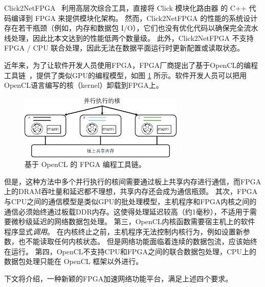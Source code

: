 Click2NetFPGA~\cite {Click2NetFPGA} 利用高层次综合工具，直接将 Click 模块化路由器 \cite {kohler2000click} 的 C++ 代码编译到 FPGA 来提供模块化架构。
然而，Click2NetFPGA 的性能的系统设计存在若干瓶颈（例如，内存和数据包 I/O），它们也没有优化代码以确保完全流水线处理，因此比本文达到的性能低两个数量级。
此外，Click2NetFPGA 不支持 FPGA / CPU 联合处理，因此无法在数据平面运行时更新配置或读取状态。

近年来，为了让软件开发人员使用FPGA，FPGA厂商提出了基于OpenCL的编程工具链~\cite{aoc,sdaccel}，提供了类似GPU的编程模型，如图 \ref{intro:fig:opencl} 所示。软件开发人员可以把用OpenCL语言编写的核（kernel）卸载到FPGA上。


\begin{figure}[htbp]
	\centering
	\includegraphics[width=0.7\textwidth]{figures/opencl.pdf}
	\caption{基于 OpenCL 的 FPGA 编程工具链。}
	\label{intro:fig:opencl}
\end{figure}


但是，这种方法中多个并行执行的核间需要通过板上共享内存进行通信，而FPGA上的DRAM吞吐量和延迟都不理想，共享内存还会成为通信瓶颈。
其次，FPGA与CPU之间的通信模型是类似GPU的批处理模型，主机程序和FPGA内核之间的通信必须始终通过板载DDR内存。这使得处理延迟较高（约1毫秒），不适用于需要微秒级延迟的网络数据包处理。
第三，OpenCL内核函数需要宿主机上的软件程序显式\textit {调用}。
在内核终止之前，主机程序无法控制内核行为，例如设置新参数，也不能读取任何内核状态。
但是网络功能面临着连续的数据包流，应该始终在运行。
第四，OpenCL不支持CPU和FPGA之间的联合数据包处理，CPU上的数据包处理只能在 OpenCL 框架以外进行。




下文将介绍\name{}，一种新颖的FPGA加速网络功能平台，满足上述四个要求。

